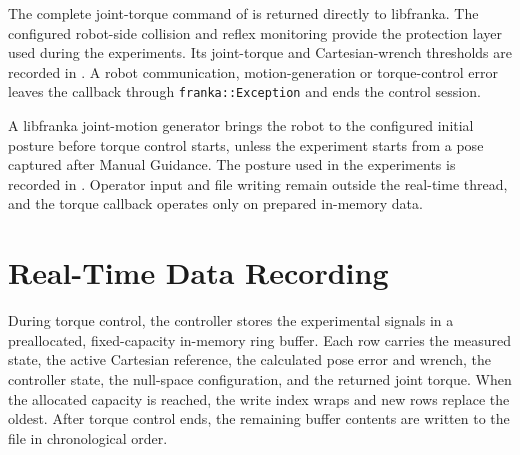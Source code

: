 The complete joint-torque command of
\mbox{} is returned directly to
libfranka. The configured robot-side collision and reflex monitoring provide
the protection layer used during the experiments. Its joint-torque and
Cartesian-wrench thresholds are recorded in
\mbox{}. A robot communication,
motion-generation or torque-control error leaves the callback through
\mbox{\texttt{franka::Exception}} and ends the control session.

A libfranka joint-motion generator brings the robot to the configured initial
posture before torque control starts, unless the experiment starts from a pose
captured after Manual Guidance. The posture used in the experiments is recorded
in \mbox{}. Operator input and file writing
remain outside the real-time thread, and the torque callback operates only on
prepared in-memory data.


\section{Real-Time Data Recording}
\label{sec:recorded_signals}
\label{subsec:chronological_log_output}
\label{subsec:setup_run_evaluation}

During torque control, the controller stores the experimental signals in a
preallocated, fixed-capacity in-memory ring buffer. Each row carries the
measured state, the active Cartesian reference, the calculated pose error and
wrench, the controller state, the null-space configuration, and the returned
joint torque. When the allocated capacity is reached, the write index wraps and
new rows replace the oldest. After torque control ends, the remaining buffer
contents are written to the \mbox{} file in chronological order.
